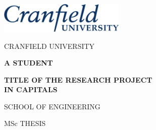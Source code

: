 



\thispagestyle{empty}

\Large \begin{center}


\begin{flushright}
    \includegraphics[width=6.0cm]{figures/logos_Cranfield/Cranfield_logo_blue}
\end{flushright}

\vspace{10mm}

CRANFIELD UNIVERSITY

\vspace{40mm}

\LARGE \textbf{A STUDENT}

\vspace{25mm}

\textbf{TITLE OF THE RESEARCH PROJECT \\
IN CAPITALS}

\vspace{55mm}

\Large SCHOOL OF ENGINEERING

\vspace{20mm}

MSc THESIS

\end{center} \normalsize

\pagebreak


\ClearDoublePageOrNot{\controlClearPage} %


